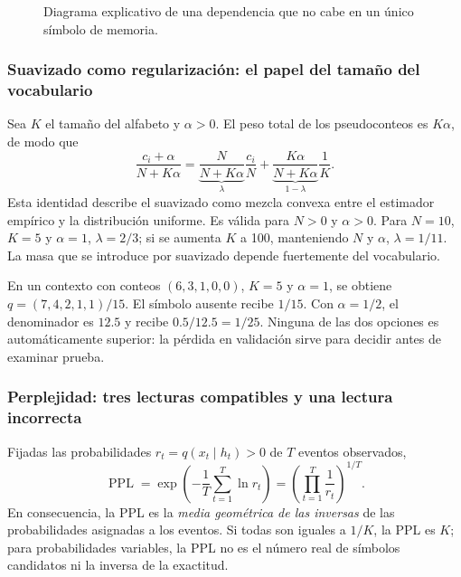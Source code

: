 \begin{figure}[H]\centering
{}
\caption{Diagrama explicativo de una dependencia que no cabe en un único símbolo de memoria.}
\end{figure}

\subsubsection*{Suavizado como regularización: el papel del tamaño del vocabulario}

Sea $K$ el tamaño del alfabeto y $\alpha>0$. El peso total de los
pseudoconteos es $K\alpha$, de modo que
\[
\frac{c_i+\alpha}{N+K\alpha}
=\underbrace{\frac{N}{N+K\alpha}}_{\lambda}\frac{c_i}{N}
 +\underbrace{\frac{K\alpha}{N+K\alpha}}_{1-\lambda}\frac1K.
\]
Esta identidad describe el suavizado como mezcla convexa entre el estimador
empírico y la distribución uniforme. Es válida para $N>0$ y $\alpha>0$.
Para $N=10$, $K=5$ y $\alpha=1$, $\lambda=2/3$; si se aumenta
$K$ a 100, manteniendo $N$ y $\alpha$, $\lambda=1/11$. La masa que
se introduce por suavizado depende fuertemente del vocabulario.

\begin{ejemplo}
En un contexto con conteos $(6,3,1,0,0)$, $K=5$ y $\alpha=1$,
se obtiene $q=(7,4,2,1,1)/15$. El símbolo ausente recibe $1/15$.
Con $\alpha=1/2$, el denominador es $12.5$ y recibe $0.5/12.5=1/25$.
Ninguna de las dos opciones es automáticamente superior: la pérdida en
validación sirve para decidir antes de examinar prueba.
\end{ejemplo}

\subsubsection*{Perplejidad: tres lecturas compatibles y una lectura incorrecta}

Fijadas las probabilidades $r_t=q(x_t\mid h_t)>0$ de $T$ eventos observados,
\[
\operatorname{PPL}
=\exp\left(-\frac1T\sum_{t=1}^T\ln r_t\right)
=\left(\prod_{t=1}^T\frac1{r_t}\right)^{1/T}.
\]
En consecuencia, la PPL es la \emph{media geométrica de las inversas}
de las probabilidades asignadas a los eventos. Si todas son iguales a
$1/K$, la PPL es $K$; para probabilidades variables, la PPL no es
el número real de símbolos candidatos ni la inversa de la exactitud.

